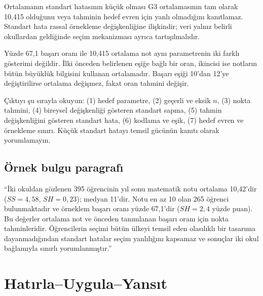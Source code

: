 Ortalamanın standart hatasının küçük olması G3 ortalamasının tam olarak 10,415
olduğunu veya tahminin hedef evren için yanlı olmadığını kanıtlamaz. Standart
hata rassal örnekleme değişkenliğine ilişkindir; veri yalnız belirli okullardan
geldiğinde seçim mekanizması ayrıca tartışılmalıdır.

\begin{mistakebox}
Yüzde 67,1 başarı oranı ile 10,415 ortalama not aynı parametrenin iki farklı
gösterimi değildir. İlki önceden belirlenen eşiğe bağlı bir oran, ikincisi ise
notların bütün büyüklük bilgisini kullanan ortalamadır. Başarı eşiği 10'dan
12'ye değiştirilirse ortalama değişmez, fakat oran tahmini değişir.
\end{mistakebox}

\begin{outputguidebox}
Çıktıyı şu sırayla okuyun: (1) hedef parametre, (2) geçerli ve eksik $n$,
(3) nokta tahmini, (4) bireysel değişkenliği gösteren standart sapma,
(5) tahmin değişkenliğini gösteren standart hata, (6) kodlama ve eşik,
(7) hedef evren ve örnekleme sınırı. Küçük standart hatayı temsil gücünün
kanıtı olarak yorumlamayın.
\end{outputguidebox}

\subsection{Örnek bulgu paragrafı}

``İki okuldan gözlenen 395 öğrencinin yıl sonu matematik notu ortalama
10,42'dir ($SS=4{,}58$, $SH=0{,}23$); medyan 11'dir. Notu en az 10 olan 265
öğrenci bulunmaktadır ve örneklem başarı oranı yüzde 67,1'dir
($SH=2{,}4$ yüzde puan). Bu değerler ortalama not ve önceden tanımlanan başarı
oranı için nokta tahminleridir. Öğrencilerin seçimi bütün ülkeyi temsil eden
olasılıklı bir tasarıma dayanmadığından standart hatalar seçim yanlılığını
kapsamaz ve sonuçlar iki okul bağlamıyla sınırlı yorumlanmıştır.''





\section*{Hatırla--Uygula--Yansıt}

